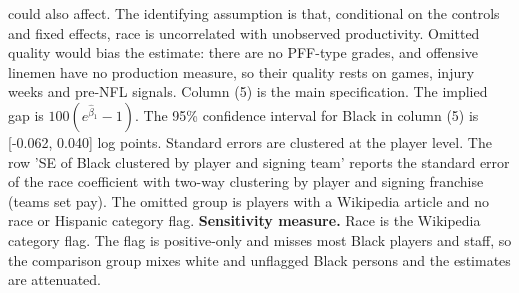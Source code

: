 \begin{table}[!h]
{\begin{threeparttable}
\begin{tablenotes}[para]
could also affect. The identifying assumption is that, conditional on the controls and fixed effects, race is uncorrelated with unobserved productivity. Omitted quality would bias the estimate: there are no PFF-type grades, and offensive linemen have no production measure, so their quality rests on games, injury weeks and pre-NFL signals. Column (5) is the main specification. The implied gap is $100(e^{\hat\beta_1}-1)$. The 95\% confidence interval for Black in column (5) is [-0.062, 0.040] log points. Standard errors are clustered at the player level. The row 'SE of Black clustered by player and signing team' reports the standard error of the race coefficient with two-way clustering by player and signing franchise (teams set pay). The omitted group is players with a Wikipedia article and no race or Hispanic category flag. \textbf{Sensitivity measure.} Race is the Wikipedia category flag. The flag is positive-only and misses most Black players and staff, so the comparison group mixes white and unflagged Black persons and the estimates are attenuated.
\end{tablenotes}
\end{threeparttable}}
\end{table}
